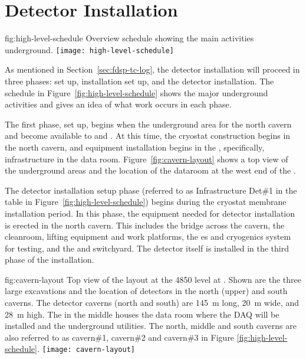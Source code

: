 \section{Detector Installation}
\label{sec:fdsp-tc-inst}



\begin{dunefigure}{fig:high-level-schedule}
  {Overview schedule showing the main activities underground.}
\texttt{[image: high-level-schedule]}
\end{dunefigure}


As mentioned in Section~\ref{sec:fdsp-tc-log}, the  detector installation will proceed in three phases:  set up, installation set up, and the detector installation. The schedule in Figure~\ref{fig:high-level-schedule} shows the major underground activities and gives an idea of what work occurs in each phase. 

The first phase,  set up, begins when the underground area for the north cavern and  become available to  and . At this time, the  cryostat construction begins in the north cavern, and  equipment installation 
begins in the , specifically, infrastructure in the  data room. Figure~\ref{fig:cavern-layout} shows a top view of the underground areas and the location of the dataroom at the west end of the . 

The detector installation setup phase (referred to as Infrastructure Det\#1 in the table in Figure~\ref{fig:high-level-schedule}) begins during the cryostat membrane installation period. 
In this phase, the equipment needed for detector installation is erected in the north cavern. This includes the bridge across the cavern, the cleanroom, lifting equipment and work platforms, the \coldbox{}es and cryogenics system for  testing, and the  and switchyard. 
The detector itself is installed in the third phase of the installation. 

\begin{dunefigure}{fig:cavern-layout}
  {Top view of the layout at the 4850 level at . Shown are the three large excavations and the location of detectors in the north (upper) and south caverns. 
The detector caverns (north and south) are \SI{145}{\meter} long, \SI{20}{\meter} wide, and  \SI{28}{\meter} high.   The  in the middle houses the  data room where the DAQ will be installed and the underground utilities. The north, middle and south caverns are also referred to as cavern\#1, cavern\#2 and cavern\#3 in Figure \ref{fig:high-level-schedule}.}
\texttt{[image: cavern-layout]}
\end{dunefigure}


